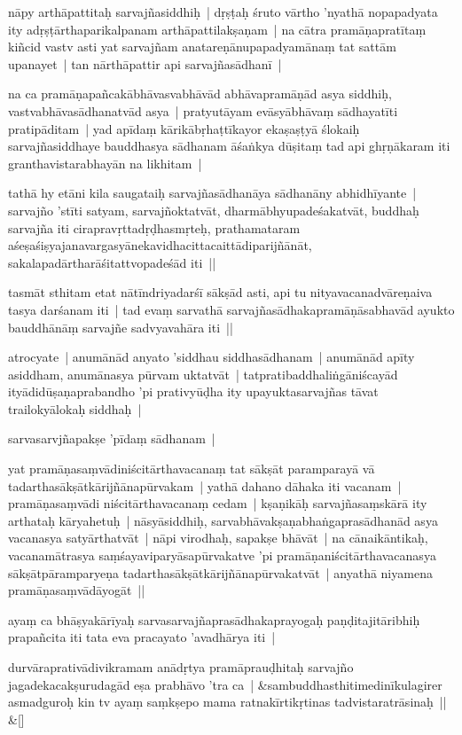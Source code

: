\documentclass[article,12pt,a4paper]{memoir}
\begin{document}
	  \pstart nāpy arthāpattitaḥ sarvajñasiddhiḥ | dṛṣṭaḥ śruto vārtho 'nyathā nopapadyata ity adṛṣṭārthaparikalpanam arthāpattilakṣaṇam | na cātra pramāṇapratītaṃ kiñcid vastv asti yat sarvajñam anatareṇānupapadyamānaṃ tat sattām upanayet | tan nārthāpattir api sarvajñasādhanī | 
	\pend
      

	  \pstart na ca pramāṇapañcakābhāvasvabhāvād abhāvapramāṇād asya siddhiḥ, vastvabhāvasādha\leavevmode{}\label{RNAms_17a}natvād asya | pratyutāyam evāsyābhāvaṃ sādhayatīti pratipāditam | yad apīdaṃ kārikābṛhaṭtīkayor ekaṣaṣṭyā ślokaiḥ sarvajñasiddhaye bauddhasya sādhanam āśaṅkya dūṣitaṃ tad api ghṛṇākaram iti granthavistarabhayān na likhitam |
	\pend
      

	  \pstart tathā hy etāni kila saugataiḥ sarvajñasādhanāya sādhanāny abhidhīyante | sarvajño 'stīti satyam, sarvajñoktatvāt, dharmābhyupadeśakatvāt, buddhaḥ sarvajña iti cirapravṛttadṛḍhasmṛteḥ, prathamataram aśeṣaśiṣyajanavargasyānekavidhacittacaittādiparijñānāt, sakalapadārtharāśitattvopadeśād iti || 
	\pend
      

	  \pstart tasmāt sthitam etat nātīndriyadarśī sākṣād asti, api tu nityavacanadvāreṇaiva tasya darśanam iti | tad evaṃ sarvathā sarvajñasādhakapramāṇāsabhavād ayukto bauddhānāṃ sarvajñe sadvyavahāra iti || 
	\pend
      

	  \pstart atrocyate | anumānād anyato 'siddhau siddhasādhanam | anumānād apīty asiddham, anumānasya pūrvam uktatvāt | tatpratibaddhaliṅgāniścayād ityādidūṣaṇaprabandho 'pi prativyūḍha ity upayuktasarvajñas tāvat trailokyālokaḥ siddhaḥ | 
	\pend
      

	  \pstart sarvasarvjñapakṣe 'pīdaṃ sādhanam | 
	\pend
      

	  \pstart yat pramāṇasaṃvādiniścitārthavacanaṃ tat sākṣāt paramparayā vā tadarthasākṣātkārijñānapūrvakam | yathā dahano dāhaka iti vacanam | pramāṇasaṃvādi niścitārthavacanaṃ cedam | kṣaṇikāḥ sarvajñasaṃskārā ity arthataḥ kāryahetuḥ | nāsyāsiddhiḥ, sarvabhāvakṣaṇabhaṅgaprasādhanād asya vacanasya satyārthatvāt | nāpi virodhaḥ, sapakṣe bhāvāt | na cānaikāntikaḥ, vacanamātrasya saṃśayaviparyāsapūrvakatve 'pi pramāṇaniścitārthavacanasya sākṣātpāramparyeṇa tadarthasākṣātkārijñānapūrvakatvāt | anyathā niyamena pramāṇasaṃvādāyogāt || 
	\pend
      

	  \pstart ayaṃ ca bhāṣyakārīyaḥ sarvasarvajñaprasādhakaprayogaḥ paṇḍitajitāribhiḥ prapañcita iti tata eva pracayato 'avadhārya iti | 
	\pend
      
	    
	    \stanza[\smallbreak]
	durvāraprativādivikramam anādṛtya pramāprauḍhitaḥ sarvajño jagadekacakṣurudagād eṣa prabhāvo 'tra ca | &sambuddhasthitimedinīkulagirer asmadguroḥ kin tv ayaṃ saṃkṣepo mama ratnakīrtikṛtinas tadvistaratrāsinaḥ || \&[\smallbreak]
\end{document}
